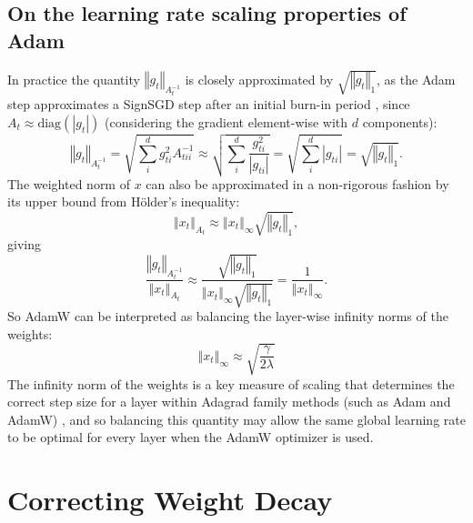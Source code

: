 \documentclass[]{fairmeta}
\begin{document}
\subsection{On the learning rate scaling properties of Adam}
In practice the quantity $\left\Vert g_{t}\right\Vert _{A_{t}^{-1}}$
is closely approximated by $\sqrt{\left\Vert g_{t}\right\Vert _{1}}$, as the Adam step approximates a SignSGD
step after an initial burn-in period \citep{bernstein2018signsgd}, since $A_{t}\approx\text{diag}\left(\left
|g_{t}\right|\right)$ (considering the
gradient element-wise with $d$ components):
\[
\left\Vert g_{t}\right\Vert _{A_{t}^{-1}}
=
\sqrt{
\sum_{i}^{d}g_{ti}^{2}A_{tii}^{-1}} \approx 
\sqrt{\sum_{i}^{d}\frac{g_{ti}^{2}}{\left|g_{ti}\right|}}
=\sqrt{\sum_{i}^{d}\left|g_{ti}\right|}
=\sqrt{\left\Vert g_{t}\right\Vert _{1}}.
\]
The weighted norm of $x$  can also be approximated in a non-rigorous fashion by its upper bound from H\"older's inequality: 
\[
\left\Vert x_{t}\right\Vert _{A_{t}}\approx\left\Vert x_{t}\right\Vert _{\infty}\sqrt{\left\Vert g_{t}\right\Vert _{1}},
\]
giving
\[
\frac{\left\Vert g_{t}\right\Vert _{A_{t}^{-1}}}{\left\Vert x_{t}\right\Vert _{A_{t}}}\approx
\frac{\sqrt{\left\Vert g_{t}\right\Vert_{1}}}{\left\Vert x_{t}\right\Vert _{\infty}\sqrt{\left\Vert g_{t}\right\Vert_{1}}}=\frac{1}{\left\Vert x_{t}\right\Vert _{\infty}}.
\]
So AdamW can be interpreted as balancing the layer-wise infinity norms
of the weights:
\[
\left\Vert x_{t}\right\Vert _{\infty} \approx \sqrt{\frac{\gamma}{2\lambda}}
\] The infinity norm of the weights is a key measure
of scaling that determines the correct step size for a layer within
Adagrad family methods (such as Adam and AdamW) \citep{adagrad, orabona2019modern,defazio2023dadapt}, and so balancing this quantity
may allow the same global learning rate to be optimal for every layer when the AdamW optimizer is used.

\section{Correcting Weight Decay}
\end{document}
